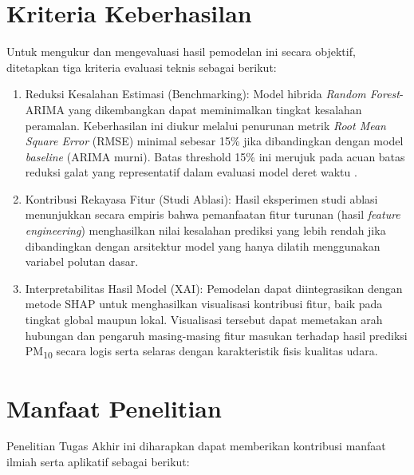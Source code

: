 \section{Kriteria Keberhasilan}

Untuk mengukur dan mengevaluasi hasil pemodelan ini secara objektif, ditetapkan tiga kriteria evaluasi teknis sebagai berikut:

\begin{enumerate}
   \item {Reduksi Kesalahan Estimasi (Benchmarking):} Model hibrida \textit{Random Forest}-ARIMA yang dikembangkan dapat meminimalkan tingkat kesalahan peramalan. Keberhasilan ini diukur melalui penurunan metrik \textit{Root Mean Square Error} (RMSE) minimal sebesar 15\% jika dibandingkan dengan model \textit{baseline} (ARIMA murni). Batas threshold 15\% ini merujuk pada acuan batas reduksi galat yang representatif dalam evaluasi model deret waktu \autocite{yenkikar2025explainable}.
   \item {Kontribusi Rekayasa Fitur (Studi Ablasi):} Hasil eksperimen studi ablasi menunjukkan secara empiris bahwa pemanfaatan fitur turunan (hasil \textit{feature engineering}) menghasilkan nilai kesalahan prediksi yang lebih rendah jika dibandingkan dengan arsitektur model yang hanya dilatih menggunakan variabel polutan dasar.
   \item {Interpretabilitas Hasil Model (XAI):} Pemodelan dapat diintegrasikan dengan metode SHAP untuk menghasilkan visualisasi kontribusi fitur, baik pada tingkat global maupun lokal. Visualisasi tersebut dapat memetakan arah hubungan dan pengaruh masing-masing fitur masukan terhadap hasil prediksi PM\textsubscript{10} secara logis serta selaras dengan karakteristik fisis kualitas udara.
\end{enumerate}

\section{Manfaat Penelitian}

Penelitian Tugas Akhir ini diharapkan dapat memberikan kontribusi manfaat ilmiah serta aplikatif sebagai berikut:

